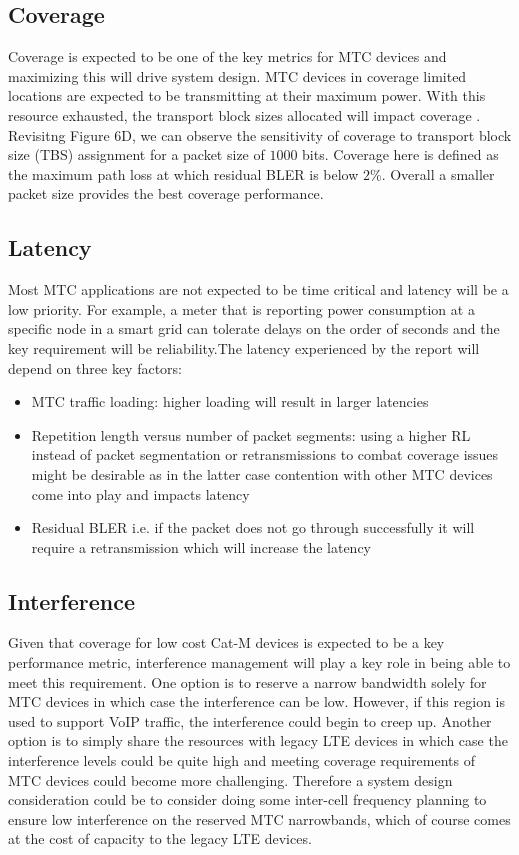 \documentclass[conference,compsoc]{IEEEtran}
\begin{document}
\subsection{Coverage}
    Coverage is expected to be one of the key metrics for MTC devices and maximizing this will drive system design. MTC devices in coverage limited locations are expected to be transmitting at their maximum power. With this resource exhausted, the transport block sizes allocated will impact  coverage . Revisitng Figure $6$D, we can observe the sensitivity of coverage to transport block size (TBS) assignment for a packet size of  $1000$ bits.  Coverage here is defined as the maximum  path loss at which residual BLER is below $2$\%. Overall a smaller packet size provides the best coverage performance.
    
\subsection{Latency}
Most MTC applications are not expected to be time critical and latency will be a low priority. For example, a meter that is reporting power consumption at a specific node in a smart grid can tolerate delays on the order of seconds and the key requirement will be reliability.The latency experienced by the report will depend on three key factors:
\begin{itemize}
    \item{MTC traffic loading: higher loading will result in larger latencies}
    \item{Repetition length versus number of packet segments: using a higher RL instead of packet segmentation or retransmissions to combat coverage issues might be desirable as in the latter case contention with other MTC devices come into play and impacts latency}
    \item{Residual BLER i.e. if the packet does not go through successfully it will require a retransmission which will increase the latency}
\end{itemize}

\subsection{Interference}
Given that coverage for low cost Cat-M devices is expected to be a key performance metric, interference management will play a key role in being able to meet this requirement. One option is to reserve a narrow bandwidth solely for MTC devices in which case the interference can be low. However, if this region is used to support VoIP traffic, the interference could begin to creep up. Another option is to simply share the resources with legacy LTE devices in which case the interference levels could be quite high and meeting coverage requirements of MTC devices could become more challenging. Therefore a system design consideration could be to consider doing some inter-cell frequency planning to ensure low interference on the reserved MTC narrowbands, which of course comes at the cost of capacity to the legacy LTE devices.
\end{document}
